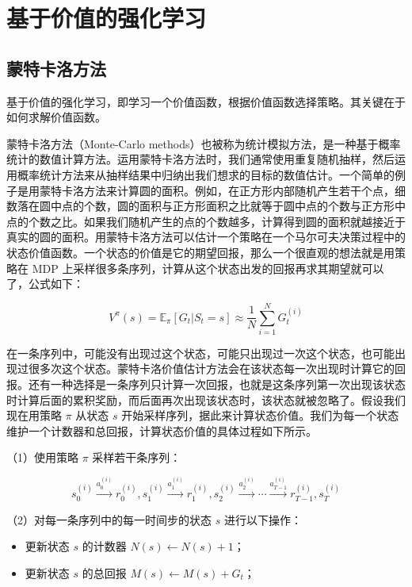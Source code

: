\hypertarget{ux57faux4e8eux4ef7ux503cux7684ux5f3aux5316ux5b66ux4e60}{%
\chapter{基于价值的强化学习}\label{ux57faux4e8eux4ef7ux503cux7684ux5f3aux5316ux5b66ux4e60}}

\hypertarget{ux8499ux7279ux5361ux6d1bux65b9ux6cd5}{%
\section{蒙特卡洛方法}\label{ux8499ux7279ux5361ux6d1bux65b9ux6cd5}}

基于价值的强化学习，即学习一个价值函数，根据价值函数选择策略。其关键在于如何求解价值函数。

蒙特卡洛方法（Monte-Carlo methods）也被称为统计模拟方法，是一种基于概率统计的数值计算方法。运用蒙特卡洛方法时，我们通常使用重复随机抽样，然后运用概率统计方法来从抽样结果中归纳出我们想求的目标的数值估计。一个简单的例子是用蒙特卡洛方法来计算圆的面积。例如，在正方形内部随机产生若干个点，细数落在圆中点的个数，圆的面积与正方形面积之比就等于圆中点的个数与正方形中点的个数之比。如果我们随机产生的点的个数越多，计算得到圆的面积就越接近于真实的圆的面积。用蒙特卡洛方法可以估计一个策略在一个马尔可夫决策过程中的状态价值函数。一个状态的价值是它的期望回报，那么一个很直观的想法就是用策略在 MDP 上采样很多条序列，计算从这个状态出发的回报再求其期望就可以了，公式如下：

\[
V^\pi(s)=\mathbb{E}_\pi[G_t|S_t=s]\approx \frac{1}{N}\sum_{i=1}^{N}G_t^{(i)}
\]

在一条序列中，可能没有出现过这个状态，可能只出现过一次这个状态，也可能出现过很多次这个状态。蒙特卡洛价值估计方法会在该状态每一次出现时计算它的回报。还有一种选择是一条序列只计算一次回报，也就是这条序列第一次出现该状态时计算后面的累积奖励，而后面再次出现该状态时，该状态就被忽略了。假设我们现在用策略 \(\pi\) 从状态 \(s\) 开始采样序列，据此来计算状态价值。我们为每一个状态维护一个计数器和总回报，计算状态价值的具体过程如下所示。

（1）使用策略 \(\pi\) 采样若干条序列：

\[
s_0^{(i)} \xrightarrow{a_0^{(i)}} r_0^{(i)},s_1^{(i)} \xrightarrow{a_1^{(i)}} r_1^{(i)},s_2^{(i)} \xrightarrow{a_2^{(i)}} \cdots \xrightarrow{a_{T-1}^{(i)}} r_{T-1}^{(i)},s_T^{(i)}
\]

（2）对每一条序列中的每一时间步的状态 \(s\) 进行以下操作：

\begin{itemize}
\tightlist
\item
  更新状态 \(s\) 的计数器 \(N(s)\leftarrow N(s)+1\)；
\item
  更新状态 \(s\) 的总回报 \(M(s)\leftarrow M(s)+G_t\)；
\end{itemize}

